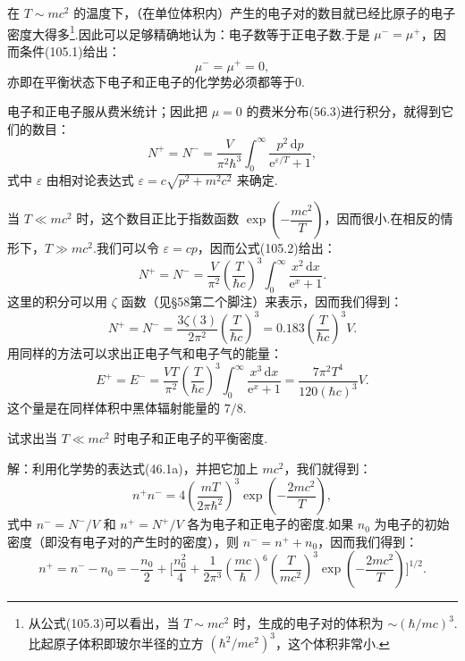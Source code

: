 在 $T\sim mc^2$ 的温度下，（在单位体积内）产生的电子对的数目就已经比原子的电子密度大得多\footnote{从公式(105.3)可以看出，当 $T\sim mc^{2}$ 时，生成的电子对的体积为 $\sim(\hbar/mc)^{3}$. 比起原子体积即玻尔半径的立方 $(\hbar^{2}/me^{2})^{3}$，这个体积非常小.}.因此可以足够精确地认为：电子数等于正电子数.于是 $\mu^-=\mu^+$，因而条件(105.1)给出：
\begin{equation*}
  \mu^-=\mu^+=0,
\end{equation*}
亦即在平衡状态下电子和正电子的化学势必须都等于0.

电子和正电子服从费米统计；因此把 $\mu=0$ 的费米分布(56.3)进行积分，就得到它们的数目：
\begin{equation}
  N^+=N^-=\frac{V}{\pi^2\hbar^3}
  \int_0^{\infty}\frac{p^2\,\mathrm{d}p}{\mathrm{e}^{\varepsilon/T}+1},
\end{equation}
式中 $\varepsilon$ 由相对论表达式 $\varepsilon=c\sqrt{p^2+m^2c^2}$ 来确定.

当 $T\ll mc^2$ 时，这个数目正比于指数函数 $\exp\left(-\dfrac{mc^2}{T}\right)$，因而很小.在相反的情形下，$T\gg mc^2$.我们可以令 $\varepsilon=cp$，因而公式(105.2)给出：
\begin{equation*}
  N^+=N^-=\frac{V}{\pi^2}\left(\frac{T}{\hbar c}\right)^3
  \int_0^{\infty}\frac{x^2\,\mathrm{d}x}{\mathrm{e}^x+1}.
\end{equation*}
这里的积分可以用 $\zeta$ 函数（见§58第二个脚注）来表示，因而我们得到：
\begin{equation}
  N^+=N^-=\frac{3\zeta(3)}{2\pi^2}\left(\frac{T}{\hbar c}\right)^3
  =0.183\left(\frac{T}{\hbar c}\right)^3V.
\end{equation}
用同样的方法可以求出正电子气和电子气的能量：
\begin{equation*}
  E^+=E^-=\frac{VT}{\pi^2}\left(\frac{T}{\hbar c}\right)^3
  \int_0^{\infty}\frac{x^3\,\mathrm{d}x}{\mathrm{e}^x+1}
  =\frac{7\pi^2T^4}{120(\hbar c)^3}V.
\end{equation*}
这个量是在同样体积中黑体辐射能量的 $7/8$.

\begin{xiti}

\quad 试求出当 $T\ll mc^2$ 时电子和正电子的平衡密度.

解：利用化学势的表达式(46.1a)，并把它加上 $mc^2$，我们就得到：
\begin{equation*}
  n^+n^-=4\left(\frac{mT}{2\pi\hbar^2}\right)^3
  \exp\left(-\frac{2mc^2}{T}\right),
\end{equation*}
式中 $n^-=N^-/V$ 和 $n^+=N^+/V$ 各为电子和正电子的密度.如果 $n_0$ 为电子的初始密度（即没有电子对的产生时的密度），则 $n^-=n^++n_0$，因而我们得到：
\begin{equation*}
  n^+=n^--n_0=-\frac{n_0}{2}
  +\bigg[\frac{n_0^2}{4}
  +\frac{1}{2\pi^3}\left(\frac{mc}{\hbar}\right)^6
  \left(\frac{T}{mc^2}\right)^3
  \exp\left(-\frac{2mc^2}{T}\right)\bigg]^{1/2}.
\end{equation*}

\end{xiti}
